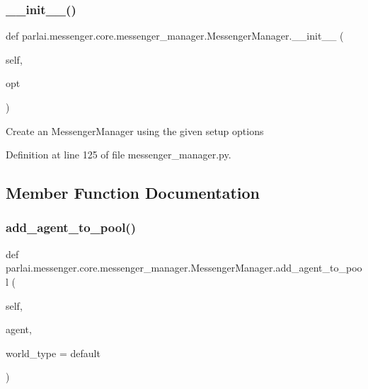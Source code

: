 \subsubsection{\texorpdfstring{\+\_\+\+\_\+init\+\_\+\+\_\+()}{\_\_init\_\_()}}
{\footnotesize\ttfamily def parlai.\+messenger.\+core.\+messenger\+\_\+manager.\+Messenger\+Manager.\+\_\+\+\_\+init\+\_\+\+\_\+ (\begin{DoxyParamCaption}\item[{}]{self,  }\item[{}]{opt }\end{DoxyParamCaption})}

\begin{DoxyVerb}Create an MessengerManager using the given setup options
\end{DoxyVerb}
 

Definition at line 125 of file messenger\+\_\+manager.\+py.



\subsection{Member Function Documentation}
\mbox{\label{classparlai_1_1messenger_1_1core_1_1messenger__manager_1_1MessengerManager_ac2b682c0085e42b1e14db6e973a5913d}} 
\subsubsection{\texorpdfstring{add\+\_\+agent\+\_\+to\+\_\+pool()}{add\_agent\_to\_pool()}}
{\footnotesize\ttfamily def parlai.\+messenger.\+core.\+messenger\+\_\+manager.\+Messenger\+Manager.\+add\+\_\+agent\+\_\+to\+\_\+pool (\begin{DoxyParamCaption}\item[{}]{self,  }\item[{}]{agent,  }\item[{}]{world\+\_\+type = {\ttfamily \textquotesingle{}default\textquotesingle{}} }\end{DoxyParamCaption})}

